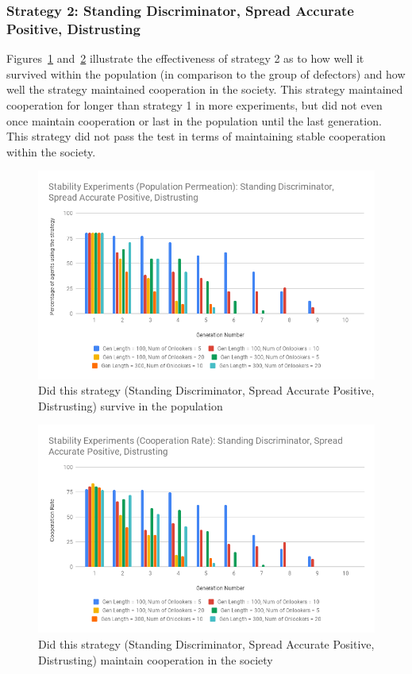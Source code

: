 \documentclass[]{final_report}
\begin{document}
\subsubsection{Strategy 2: Standing Discriminator, Spread Accurate Positive, Distrusting}
Figures~\ref{fig:sdsapdtStabPop} and~\ref{fig:sdsapdtStabCoop} illustrate the effectiveness of strategy 2 as to how well it survived within the population (in comparison to the group of defectors) and how well the strategy maintained cooperation in the society. This strategy maintained cooperation for longer than strategy 1 in more experiments, but did not even once maintain cooperation or last in the population until the last generation. This strategy did not pass the test in terms of maintaining stable cooperation within the society.
\begin{figure}
\begin{framed}
	\includegraphics[width=\textwidth]{sdsapdtStabPop.png}
	\caption{Did this strategy (Standing Discriminator, Spread Accurate Positive, Distrusting) survive in the population}
	\label{fig:sdsapdtStabPop}
\end{framed}
\end{figure}
\begin{figure}
\begin{framed}
	\includegraphics[width=\textwidth]{sdsapdtStabCoop.png}
	\caption{Did this strategy (Standing Discriminator, Spread Accurate Positive, Distrusting) maintain cooperation in the society}
	\label{fig:sdsapdtStabCoop}
\end{framed}
\end{figure}
\end{document}
